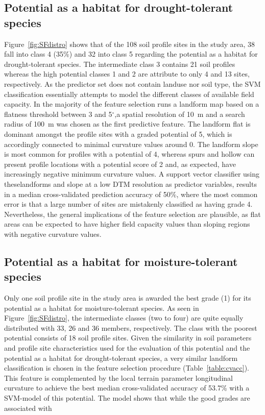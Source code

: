 \documentclass[preprint,12pt,authoryear]{elsarticle}
\begin{document}
\subsection{Potential as a habitat for drought-tolerant species}
Figure~\ref{fig:SFdistro} shows that of the 108 soil profile sites in the study area, 38 fall into class 4 (35\%) and 32 into class 5 regarding the potential as a habitat for drought-tolerant species. The intermediate class 3 contains 21 soil profiles whereas the high potential classes 1 and 2 are attribute to only 4 and 13 sites, respectively. 
As the predictor set does not contain landuse nor soil type, the SVM classification essentially attempts to model the different classes of available field capacity. In the majority of the feature selection runs a landform map based on a flatness threshold between 3 and 5$^{\circ}$,a spatial resolution of 10~m and a search radius of 100~m was chosen as the first predictive feature. The landform flat is dominant amongst the profile sites with a graded potential of 5, which is accordingly connected to minimal curvature values around 0. The landform slope is  most common for profiles with a potential  of 4, whereas spurs and hollow can present profile locations with a  potential score of 2 and, as expected, have increasingly negative minimum curvature values. A support vector classifier using theselandforms and slope at a low DTM resolution as predictor variables, results in a median cross-validated prediction accuracy of 50\%, where the most common error is that  a large number of sites are mistakenly classified as having grade 4. Nevertheless, the general implications of the feature selection are plausible, as flat areas  can  be expected to have higher field capacity values than sloping regions with negative curvature values.
\subsection{Potential as a habitat for moisture-tolerant species}
Only one soil profile site in the study area is awarded the best grade (1) for its potential as a habitat for moisture-tolerant species. As seen in Figure~\ref{fig:SFdistro}, the intermediate classes (two to four) are quite equally distributed with 33, 26 and 36 members, respectively. The class with the poorest potential consists of 18 soil profile sites.  Given the similarity in soil parameters and profile site characteristics used for the evaluation of this potential and the potential as a habitat for drought-tolerant species, a very similar landform classification  is chosen in the feature selection procedure (Table~\ref{table:cvacc}). This feature is complemented by the local terrain parameter longitudinal curvature to achieve the best median cross-validated accuracy  of 53.7\% with a SVM-model of this potential. The model shows that while the good grades are associated with
\end{document}
